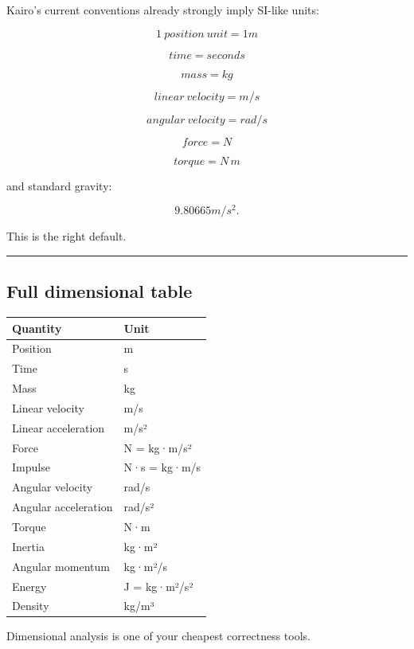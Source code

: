 Kairo's current conventions already strongly imply SI-like units:

\[
\boxed{
1\ position\ unit=1m
}
\]

\[
\boxed{
time=seconds
}
\]

\[
\boxed{
mass=kg
}
\]

\[
\boxed{
linear\ velocity=m/s
}
\]

\[
\boxed{
angular\ velocity=rad/s
}
\]

\[
\boxed{
force=N
}
\]

\[
\boxed{
torque=N\,m
}
\]

and standard gravity:

\[
9.80665m/s^2.
\]

This is the right default.

\begin{center}\rule{0.5\linewidth}{0.5pt}\end{center}

\subsection{Full dimensional table}\label{06-engine-ii-ch039-full-dimensional-table}

{\def\LTcaptype{none} %
\begin{longtable}[]{@{}ll@{}}
\toprule\noalign{}
Quantity & Unit \\
\midrule\noalign{}
\endhead
\bottomrule\noalign{}
\endlastfoot
Position & m \\
Time & s \\
Mass & kg \\
Linear velocity & m/s \\
Linear acceleration & m/s² \\
Force & N = kg·m/s² \\
Impulse & N·s = kg·m/s \\
Angular velocity & rad/s \\
Angular acceleration & rad/s² \\
Torque & N·m \\
Inertia & kg·m² \\
Angular momentum & kg·m²/s \\
Energy & J = kg·m²/s² \\
Density & kg/m³ \\
\end{longtable}
}

Dimensional analysis is one of your cheapest correctness tools.


